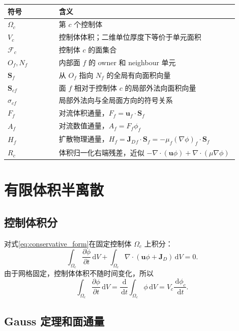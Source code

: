 \documentclass[UTF8,12pt,a4paper]{ctexart}
\numberwithin{equation}{section}
\newcommand{\dd}{\,\mathrm d}
\newcommand{\Sf}{\bm S}
\newcommand{\uf}{\bm u}
\newcommand{\Jd}{\bm J_D}
\begin{document}
\begin{longtable}{>{\centering\arraybackslash}p{0.20\linewidth}p{0.70\linewidth}}
\toprule
符号 & 含义\\
\midrule
$\Omega_c$ & 第 $c$ 个控制体\\
$V_c$ & 控制体体积；二维单位厚度下等价于单元面积\\
$\mathcal F_c$ & 控制体 $c$ 的面集合\\
$O_f,N_f$ & 内部面 $f$ 的 owner 和 neighbour 单元\\
$\Sf_f$ & 从 $O_f$ 指向 $N_f$ 的全局有向面积向量\\
$\Sf_{cf}$ & 面 $f$ 相对于控制体 $c$ 的局部外法向面积向量\\
$\sigma_{cf}$ & 局部外法向与全局面方向的符号关系\\
$F_f$ & 对流体积通量，$F_f=\uf_f\cdot\Sf_f$\\
$A_f$ & 对流数值通量，$A_f=F_f\phi_f$\\
$H_f$ & 扩散物理通量，$H_f=\Jd{}_{f}\cdot\Sf_f=-\mu_f(\nabla\phi)_f\cdot\Sf_f$\\
$R_c$ & 体积归一化右端残差，近似 $-\nabla\cdot(\uf\phi)+\nabla\cdot(\mu\nabla\phi)$\\
\bottomrule
\end{longtable}

\section{有限体积半离散}

\subsection{控制体积分}

对式\eqref{eq:conservative_form}在固定控制体 $\Omega_c$ 上积分：
\begin{equation}
  \int_{\Omega_c}\frac{\partial\phi}{\partial t}\dd V
  +
  \int_{\Omega_c}\nabla\cdot(\uf\phi+\Jd)\dd V
  =
  0.
  \label{eq:cell_integral}
\end{equation}
由于网格固定，控制体体积不随时间变化，所以
\begin{equation}
  \int_{\Omega_c}\frac{\partial\phi}{\partial t}\dd V
  =
  \frac{\dd}{\dd t}\int_{\Omega_c}\phi\dd V
  =
  V_c\frac{\dd\phi_c}{\dd t}.
  \label{eq:time_integral}
\end{equation}

\subsection{Gauss 定理和面通量}
\end{document}

